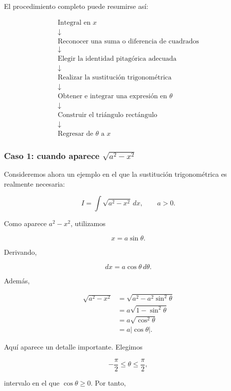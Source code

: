 \documentclass[12pt]{article}
\theoremstyle{definition}
\theoremstyle{remark}
\begin{document}
El procedimiento completo puede resumirse así:

\[
\boxed{
\begin{array}{c}
\text{Integral en }x\\
\downarrow\\
\text{Reconocer una suma o diferencia de cuadrados}\\
\downarrow\\
\text{Elegir la identidad pitagórica adecuada}\\
\downarrow\\
\text{Realizar la sustitución trigonométrica}\\
\downarrow\\
\text{Obtener e integrar una expresión en }\theta\\
\downarrow\\
\text{Construir el triángulo rectángulo}\\
\downarrow\\
\text{Regresar de }\theta\text{ a }x
\end{array}}
\]

\subsubsection*{Caso 1: cuando aparece \(\sqrt{a^2-x^2}\)}

Consideremos ahora un ejemplo en el que la sustitución trigonométrica es
realmente necesaria:

\[
I=\int\sqrt{a^2-x^2}\,dx,\qquad a>0.
\]

Como aparece $a^2-x^2$, utilizamos

\[
\boxed{x=a\sin\theta}.
\]

Derivando,

\[
dx=a\cos\theta\,d\theta.
\]

Además,

\begin{align*}
\sqrt{a^2-x^2}
&=\sqrt{a^2-a^2\sin^2\theta}\\
&=a\sqrt{1-\sin^2\theta}\\
&=a\sqrt{\cos^2\theta}\\
&=a|\cos\theta|.
\end{align*}

Aquí aparece un detalle importante. Elegimos

\[
-\frac{\pi}{2}\leq\theta\leq\frac{\pi}{2},
\]

intervalo en el que $\cos\theta\geq0$. Por tanto,
\end{document}
